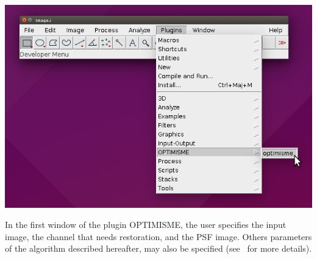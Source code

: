 \documentclass[12pt, a4paper]{scrartcl}
\begin{document}
\includegraphics[scale=0.3]{images/lancerOptimisme.png}

In the first window of the plugin OPTIMISME, the user specifies the input image,  the channel that needs restoration, and the PSF image. Others parameters of the algorithm described hereafter, may also be specified (see~\cite{chouzenoux:hal-01278102} for more details).
\end{document}

